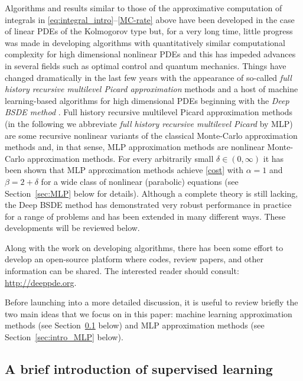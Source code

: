 \documentclass[12pt,AutoFakeBold,AutoFakeSlant]{article}
\theoremstyle{definition}
\begin{document}
	Algorithms and results similar to those of the approximative computation of integrals 
	in \eqref{eq:integral_intro}--\eqref{MC-rate} above 
	have been developed in the case of linear PDEs of the Kolmogorov type but, 
	for a very long time,  little progress was made in developing algorithms with quantitatively similar computational complexity 
	for high dimensional nonlinear PDEs and this has impeded advances in several fields such as  
	optimal control and quantum mechanics.
	Things have changed dramatically 
	in the last few years 
	with the appearance of 
	so-called {\it full history recursive 
	multilevel Picard approximation} methods \cite{E2016multilevel,E2019multilevel,Hutzenthaleretal2018arXiv} 
	and a host of machine learning-based algorithms for high dimensional PDEs 
	beginning with the {\it Deep BSDE method} \cite{EHanJentzen2017,HanJentzenE2018}. 
	Full history recursive multilevel Picard approximation methods 
	(in the following we abbreviate 
	\emph{full history recursive multilevel Picard} by MLP) 
	are some recursive nonlinear variants of the
	classical Monte-Carlo approximation methods 
	and, in that sense, MLP approximation methods are 
	nonlinear Monte-Carlo approximation methods. 
	For every arbitrarily small $ \delta \in (0,\infty) $ it has been shown 
	that MLP approximation methods achieve \eqref{cost} with 
	$ \alpha = 1 $ and $ \beta = 2 +\delta $ for a wide class of
	nonlinear (parabolic) equations (see Section~\ref{sec:MLP} below for details). 
	Although a complete theory is still lacking, the Deep BSDE method has demonstrated very
	robust performance in practice for a range of problems and has been extended in many different ways.
	These developments will be reviewed below. 

	Along with the work on developing algorithms, there has been some effort to develop an open-source
	platform where codes, review papers, and other information can be shared.  The interested reader should consult:
	\url{http://deeppde.org}.


	Before launching into a more detailed discussion, 
	it is useful to review briefly the two main ideas that 
	we focus on in this paper:
	machine learning approximation methods 
	(see Section~\ref{sec:intro_deep_learning} below) 
	and MLP approximation methods 
	(see Section~\ref{sec:intro_MLP} below).


	\subsection{A brief introduction of supervised learning}
	\label{sec:intro_deep_learning}
\end{document}
